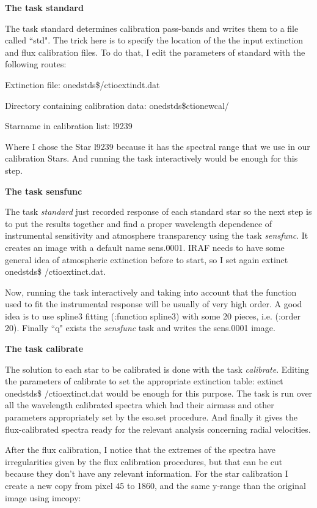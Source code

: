 \textbf{The task standard}

The task standard determines calibration pass-bands and writes them to a file called ``std". The trick here is to specify the location of the the input extinction and flux calibration files. To do that, I edit the parameters of standard with the following routes:

Extinction file:                              onedstds\$/ctioextindt.dat

Directory containing calibration data:   onedstds\$ctionewcal/

Starname in calibration list:                l9239

Where I chose the Star l9239 because it has the spectral range that we use in our calibration Stars. And running the task interactively would be enough for this step.

\textbf{The task sensfunc}

The task \textit{standard} just recorded response of each standard star so the next step is to put the results together and find a proper wavelength dependence of instrumental sensitivity and atmosphere transparency using the task \textit{sensfunc}. It creates an image with a default name sens.0001. IRAF needs to have some general idea of atmospheric extinction before to start, so I set again extinct onedstds\$ /ctioextinct.dat.

Now, running the task interactively and taking into account that the function used to fit the instrumental response will be usually of very high order. A good idea is to use spline3 fitting (:function spline3) with some 20 pieces, i.e. (:order 20).
Finally ``q" exists the \textit{sensfunc} task and writes the sens.0001 image.

\textbf{The task calibrate}

The solution to each star to be calibrated is done with the task \textit{calibrate}. Editing the parameters of calibrate to set the appropriate extinction table: extinct onedstds\$ /ctioextinct.dat would be enough for this purpose. The task is run over all the wavelength calibrated spectra which had their airmass and other parameters appropriately set by the eso.set procedure. And finally it gives the flux-calibrated spectra ready for the relevant analysis concerning radial velocities.

After the flux calibration, I notice that the extremes of the spectra have irregularities given by the flux calibration procedures, but that can be cut because they don't have any relevant information. For the star calibration I create a new copy from pixel 45 to 1860, and the same y-range than the original image using imcopy:

